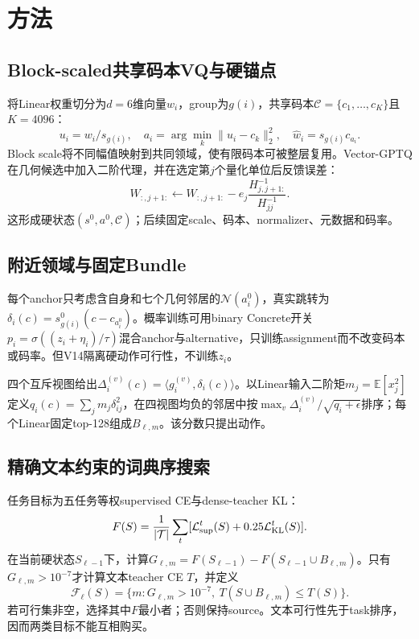 \section{方法}

\subsection{Block-scaled共享码本VQ与硬锚点}

将Linear权重切分为$d=6$维向量$w_i$，group为$g(i)$，共享码本$\mathcal C=\{c_1,\ldots,c_K\}$且$K=4096$：
\begin{equation}
u_i=w_i/s_{g(i)},\quad a_i=\arg\min_k\|u_i-c_k\|_2^2,\quad \hat w_i=s_{g(i)}c_{a_i}.
\end{equation}
Block scale将不同幅值映射到共同领域，使有限码本可被整层复用。Vector-GPTQ在几何候选中加入二阶代理，并在选定第$j$个量化单位后反馈误差：
\begin{equation}
W_{:,j+1:}\leftarrow W_{:,j+1:}-e_j\frac{H^{-1}_{j,j+1:}}{H^{-1}_{jj}}.
\end{equation}
这形成硬状态$(s^0,a^0,\mathcal C)$；后续固定scale、码本、normalizer、元数据和码率。

\subsection{附近领域与固定Bundle}

每个anchor只考虑含自身和七个几何邻居的$\mathcal N(a_i^0)$，真实跳转为$\delta_i(c)=s_{g(i)}^0(c-c_{a_i^0})$。概率训练可用binary Concrete开关$p_i=\sigma((z_i+\eta_i)/\tau)$混合anchor与alternative，只训练assignment而不改变码本或码率。但V14隔离硬动作可行性，不训练$z_i$。

四个互斥视图给出$\Delta_i^{(v)}(c)=\langle g_i^{(v)},\delta_i(c)\rangle$。以Linear输入二阶矩$m_j=\mathbb E[x_j^2]$定义$q_i(c)=\sum_jm_j\delta_{ij}^2$，在四视图均负的邻居中按$\max_v\Delta_i^{(v)}/\sqrt{q_i+\epsilon}$排序；每个Linear固定top-128组成$B_{\ell,m}$。该分数只提出动作。

\subsection{精确文本约束的词典序搜索}

任务目标为五任务等权supervised CE与dense-teacher KL：
\begin{equation}
F(S)=\frac1{|\mathcal T|}\sum_t[\mathcal L_{\rm sup}^t(S)+0.25\mathcal L_{\rm KL}^t(S)].
\end{equation}
在当前硬状态$S_{\ell-1}$下，计算$G_{\ell,m}=F(S_{\ell-1})-F(S_{\ell-1}\cup B_{\ell,m})$。只有$G_{\ell,m}>10^{-7}$才计算文本teacher CE $T$，并定义
\begin{equation}
\mathcal F_\ell(S)=\{m:G_{\ell,m}>10^{-7},\ T(S\cup B_{\ell,m})\le T(S)\}.
\end{equation}
若可行集非空，选择其中$F$最小者；否则保持source。文本可行性先于task排序，因而两类目标不能互相购买。

